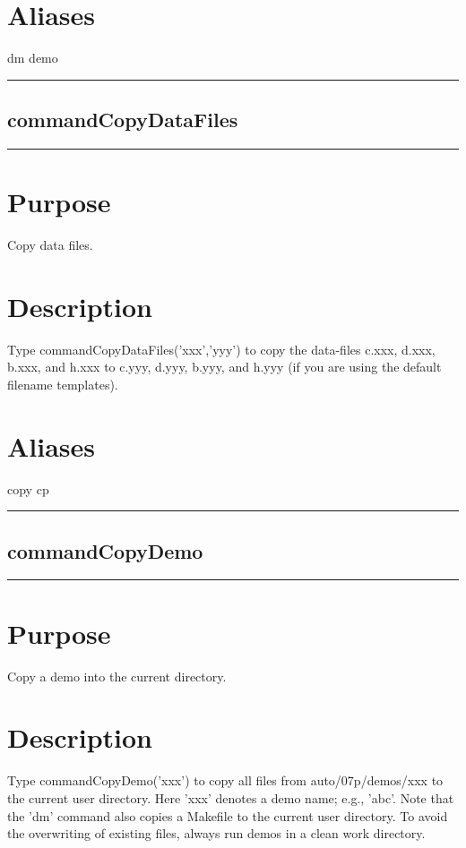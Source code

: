 \documentclass[12pt]{report}
\begin{document}
\begin{minipage}{6in}
    \section*{Aliases}
dm demo \medskip\hrule\end{minipage}\subsection{commandCopyDataFiles} \label{sec:clui_ref_commandCopyDataFiles}\begin{minipage}{6in}\hrule\medskip\section*{Purpose}
Copy data files.\section*{Description}

    Type commandCopyDataFiles('xxx','yyy') to copy the data-files c.xxx, d.xxx, b.xxx,
    and h.xxx to c.yyy, d.yyy, b.yyy, and h.yyy (if you are using the
    default filename templates).
    \section*{Aliases}
copy cp \medskip\hrule\end{minipage}\subsection{commandCopyDemo} \label{sec:clui_ref_commandCopyDemo}\begin{minipage}{6in}\hrule\medskip\section*{Purpose}
Copy a demo into the current directory.\section*{Description}

    Type commandCopyDemo('xxx') to copy all files from auto/07p/demos/xxx to the
    current user directory.  Here 'xxx' denotes a demo name; e.g.,
    'abc'.  Note that the 'dm' command also copies a Makefile to the
    current user directory. To avoid the overwriting of existing
    files, always run demos in a clean work directory.

\end{minipage}
\end{document}
